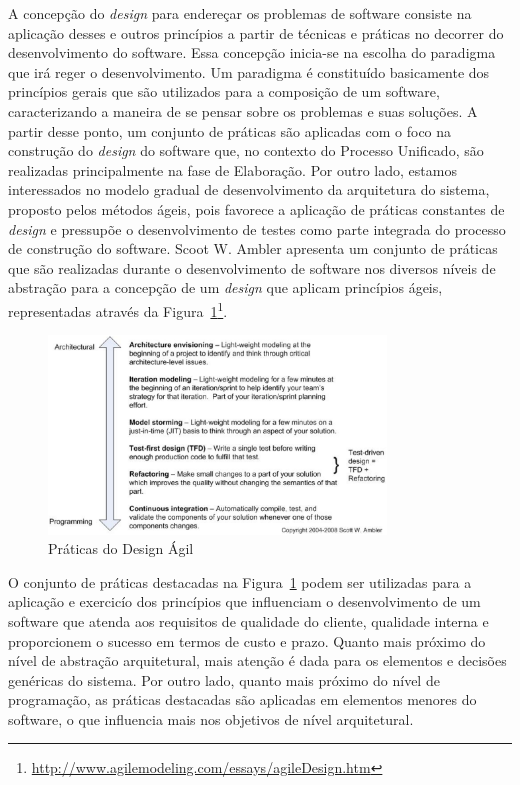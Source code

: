 A concepção do \emph{design} para endereçar os problemas de software consiste na aplicação desses e outros princípios a partir de técnicas e práticas no decorrer do desenvolvimento do software.
%
Essa concepção inicia-se na escolha do paradigma que irá reger o desenvolvimento.
%
Um paradigma é constituído basicamente dos princípios gerais que são utilizados para a composição de um software, caracterizando a maneira de se pensar sobre os problemas e suas soluções.
%
A partir desse ponto, um conjunto de práticas são aplicadas com o foco na construção do \emph{design} do software que, no contexto do Processo Unificado, são realizadas principalmente na fase de Elaboração. Por outro lado, estamos interessados no modelo gradual de desenvolvimento da arquitetura do sistema, proposto pelos métodos ágeis, pois favorece a aplicação de práticas constantes de \emph{design} e pressupõe o desenvolvimento de testes como parte integrada do processo de construção do software.
%
Scoot W. Ambler apresenta um conjunto de práticas que são realizadas durante o desenvolvimento de software nos diversos níveis de abstração para a concepção de um \emph{design} que aplicam princípios ágeis, representadas através da Figura~\ref{fig:agile-design}\footnote{\url{http://www.agilemodeling.com/essays/agileDesign.htm}}.

\graphicspath{{figuras/}}
\begin{figure}[h]
\centering
\includegraphics[width=0.8\textwidth]{agile_design_practices.eps}
\caption{Práticas do Design Ágil}
\label{fig:agile-design}
\end{figure}


O conjunto de práticas destacadas na Figura~\ref{fig:agile-design} podem ser utilizadas para a aplicação e exercicío dos princípios que influenciam o desenvolvimento de um software que atenda aos requisitos de qualidade do cliente, qualidade interna e proporcionem o sucesso em termos de custo e prazo.
% 
Quanto mais próximo do nível de abstração arquitetural, mais atenção é dada para os elementos e decisões genéricas do sistema.
%
Por outro lado, quanto mais próximo do nível de programação, as práticas destacadas são aplicadas em elementos menores do software, o que influencia mais nos objetivos de nível arquitetural.



